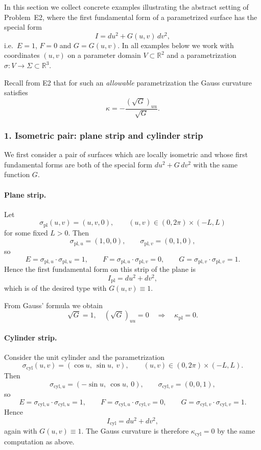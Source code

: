 \documentclass[12pt,a4paper]{article}
\theoremstyle{plain}
\theoremstyle{definition}      %
\begin{document}
In this section we collect concrete examples illustrating the abstract setting
of Problem~E2, where the first fundamental form of a parametrized surface
has the special form
\[
I = du^{2} + G(u,v)\,dv^{2},
\]
i.e.\ $E=1$, $F=0$ and $G=G(u,v)$.  In all examples below we work with
coordinates $(u,v)$ on a parameter domain $V\subset\mathbb{R}^{2}$ and a
parametrization $\sigma:V\to\Sigma\subset\mathbb{R}^{3}$.

Recall from E2 that for such an \emph{allowable} parametrization the Gauss
curvature satisfies
\[
\kappa = -\frac{(\sqrt{G})_{uu}}{\sqrt{G}}.
\]

\subsubsection*{1. Isometric pair: plane strip and cylinder strip}

We first consider a pair of surfaces which are locally isometric and whose
first fundamental forms are both of the special form $du^{2}+G\,dv^{2}$ with
the same function $G$.

\paragraph{Plane strip.}
Let
\[
\sigma_{\mathrm{pl}}(u,v) = (u,v,0),
\qquad (u,v)\in(0,2\pi)\times(-L,L)
\]
for some fixed $L>0$.  Then
\[
\sigma_{\mathrm{pl},u} = (1,0,0),\qquad
\sigma_{\mathrm{pl},v} = (0,1,0),
\]
so
\[
E = \sigma_{\mathrm{pl},u}\cdot\sigma_{\mathrm{pl},u} = 1,\qquad
F = \sigma_{\mathrm{pl},u}\cdot\sigma_{\mathrm{pl},v} = 0,\qquad
G = \sigma_{\mathrm{pl},v}\cdot\sigma_{\mathrm{pl},v} = 1.
\]
Hence the first fundamental form on this strip of the plane is
\[
I_{\mathrm{pl}} = du^{2} + dv^{2},
\]
which is of the desired type with $G(u,v)\equiv 1$.

From Gauss' formula we obtain
\[
\sqrt{G}=1,\quad (\sqrt{G})_{uu}=0
\quad\Longrightarrow\quad
\kappa_{\mathrm{pl}} = 0.
\]

\paragraph{Cylinder strip.}
Consider the unit cylinder and the parametrization
\[
\sigma_{\mathrm{cyl}}(u,v) = (\cos u,\ \sin u,\ v),\qquad
(u,v)\in(0,2\pi)\times(-L,L).
\]
Then
\[
\sigma_{\mathrm{cyl},u} = (-\sin u,\ \cos u,\ 0),\qquad
\sigma_{\mathrm{cyl},v} = (0,0,1),
\]
so
\[
E = \sigma_{\mathrm{cyl},u}\cdot\sigma_{\mathrm{cyl},u} = 1,\qquad
F = \sigma_{\mathrm{cyl},u}\cdot\sigma_{\mathrm{cyl},v} = 0,\qquad
G = \sigma_{\mathrm{cyl},v}\cdot\sigma_{\mathrm{cyl},v} = 1.
\]
Hence
\[
I_{\mathrm{cyl}} = du^{2} + dv^{2},
\]
again with $G(u,v)\equiv 1$.  The Gauss curvature is therefore
$\kappa_{\mathrm{cyl}}=0$ by the same computation as above.
\end{document}
